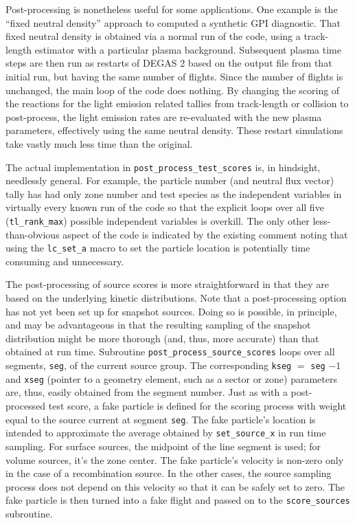 \documentclass[12pt]{report}
\begin{document}
Post-processing is nonetheless useful for some applications.
One example is the ``fixed neutral density'' approach
to computed a synthetic GPI diagnostic.  That fixed
neutral density is obtained via a normal run of the
code, using a track-length estimator 
with a particular plasma background.
Subsequent plasma time steps are then run as restarts
of DEGAS 2 based on the output file from that
initial run, but having the same number of
flights.  Since the number of flights is unchanged,
the main loop of the code does nothing.  By
changing the scoring of the reactions for the light
emission related tallies from track-length or collision
to post-process, the light emission rates are re-evaluated
with the new plasma parameters, effectively using the
same neutral density.  These restart simulations
take vastly much less time than the original.

The actual implementation in {\tt post\_process\_test\_scores}
is, in hindsight, needlessly general.  For example,
the particle number (and neutral flux vector) tally
has had only zone number and test species as the independent
variables in virtually every known run of the code so that
the explicit loops over all five ({\tt tl\_rank\_max})
possible independent variables is overkill.  The only
other less-than-obvious aspect of the code is indicated
by the existing comment noting that using the
{\tt lc\_set\_a} macro to set the particle location is
potentially time consuming and unnecessary.

The post-processing of source scores is more straightforward
in that they are based on the underlying kinetic distributions.
Note that a post-processing option has not yet been set up for
snapshot sources.  Doing so is possible, in principle, and
may be advantageous in that the resulting sampling of the
snapshot distribution might be more thorough (and, thus, more
accurate) than that obtained at run time.
Subroutine {\tt post\_process\_source\_scores} loops over
all segments, {\tt seg}, of the current source group.
The
corresponding {\tt kseg} $=$ {\tt seg} $-1$ and {\tt xseg}
(pointer to a geometry element, such as a sector or zone)
parameters are, thus, easily obtained from the segment number.
Just as with  a post-processed test score,
a fake particle is defined
for the scoring process with weight equal to the
source current at segment {\tt seg}.
The fake particle's location is intended to
approximate the average 
obtained by {\tt set\_source\_x} 
in run time sampling.
For surface sources, the midpoint
of the line segment is used; for volume sources, it's the zone
center.  The fake particle's velocity is non-zero only in the
case of a recombination source.   In the other cases, the
source sampling process does not depend on this velocity
so that it can be safely set to zero.   The fake particle
is then turned into a fake flight and passed on to the
{\tt score\_sources} subroutine.
\end{document}
